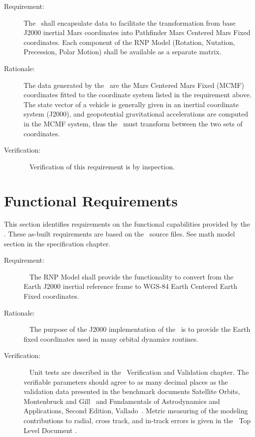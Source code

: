\label{reqt:mars_RNP_data}
\begin{description}
  \item[Requirement:]
The \ModelDesc\ shall encapsulate data to facilitate
the transformation from base J2000 inertial Mars coordinates
into Pathfinder Mars Centered Mars Fixed coordinates. Each component of the
RNP Model (Rotation, Nutation, Precession, Polar Motion) shall be available
as a separate matrix.
  \item[Rationale:]
The data generated by the \ModelDesc\ are the Mars Centered Mars Fixed (MCMF)
coordinates fitted to the coordinate system listed in the requirement above.
The state vector of a vehicle is generally given in an inertial coordinate
system (J2000), and geopotential gravitational accelerations are
computed in the MCMF system, thus the \ModelDesc\ must transform between
the two sets of coordinates.
  \item[Verification:]\ \newline
Verification of this requirement is by inspection.
\end{description}

\section{Functional Requirements}

This section identifies requirements on the functional capabilities provided
by the \ModelDesc.  These as-built requirements are based on the \ModelDesc\ source files.
See math model section in the specification chapter.

\label{reqt:earth_RNP_func}
\begin{description}
  \item[Requirement:]\ \newline
The RNP Model shall provide the functionality to convert from the Earth J2000
inertial reference frame to WGS-84 Earth Centered Earth Fixed coordinates.
  \item[Rationale:]\ \newline
The purpose of the J2000 implementation of the
\ModelDesc\ is to provide the Earth fixed
coordinates used in many orbital dynamics routines.
  \item[Verification:]\ \newline
Unit tests are described in the \ModelDesc\ Verification and
Validation chapter. The verifiable
parameters should agree to as many decimal places as the
validation data presented in the benchmark documents Satellite Orbits,
Montenbruck and Gill~\cite{MG} and Fundamentals of Astrodynamics and
Applications, Second Edition, Vallado~\cite{VMcC}.
Metric measuring of the modeling contributions to radial, cross track,
and in-track errors is given in the \JEODid\ Top Level Document
\cite{dynenv:JEOD}.
\end{description}


